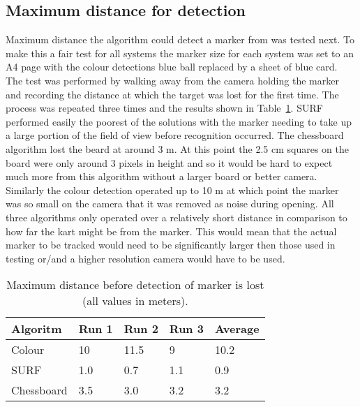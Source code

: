 \subsection{Maximum distance for detection}
Maximum distance the algorithm could detect a marker from was tested next. To make this a fair test for all systems the marker size for each system was set to an A4 page with the colour detections blue ball replaced by a sheet of blue card. The test was performed by walking away from the camera holding the marker and recording the distance at which the target was lost for the first time. The process was repeated three times and the results shown in Table~\ref{dist}. SURF performed easily the poorest of the solutions with the marker needing to take up a large portion of the field of view before recognition occurred. The chessboard algorithm lost the beard at around 3 m. At this point the 2.5 cm squares on the board were only around 3 pixels in height and so it would be hard to expect much more from this algorithm without a larger board or better camera. Similarly the colour detection operated up to 10 m at which point the marker was so small on the camera that it was removed as noise during opening. All three algorithms only operated over a relatively short distance in comparison to how far the kart might be from the marker. This would mean that the actual marker to be tracked would need to be significantly larger then those used in testing or/and a higher resolution camera would have to be used.

\begin{table}
	\begin{center}
    	\begin{tabular}{ | l | l | l | l | l |}
    	\hline
    	Algoritm & Run 1 & Run 2 & Run 3 & Average \\ \hline
		Colour & 10 & 11.5 & 9 & 10.2 \\ \hline
		SURF & 1.0 & 0.7 & 1.1 & 0.9 \\ \hline
		Chessboard & 3.5 & 3.0 & 3.2 & 3.2 \\ \hline
    	\end{tabular}
	\end{center}
	
	\caption{Maximum distance before detection of marker is lost (all values in meters).}
	\label{dist}
	
\end{table}

